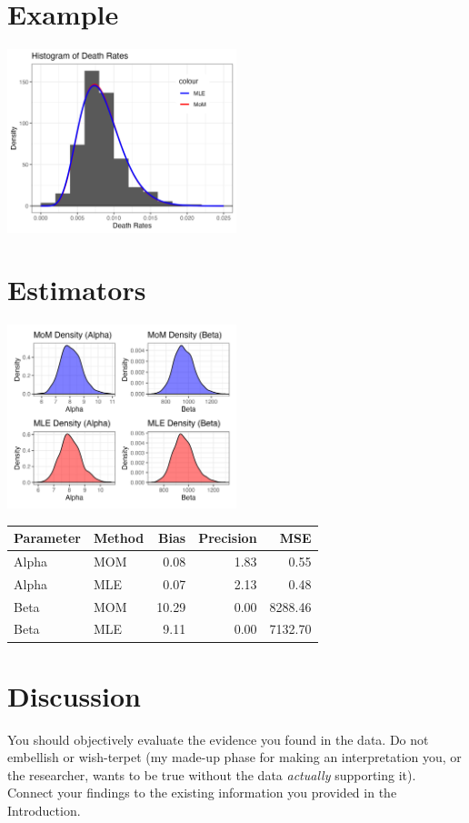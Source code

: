 \documentclass{article}\usepackage[]{graphicx}\usepackage[]{xcolor}
\newenvironment{Figure}
  {\par\medskip\noindent\minipage{\linewidth}}
  {\endminipage\par\medskip}
\begin{document}
\begin{multicols}{2}
\section{Example}
\begin{center}
  \includegraphics[width=0.5\textwidth]{task7.png}
\end{center}

\section{Estimators}

\begin{center}
  \includegraphics[width=0.5\textwidth]{task8.png}
\end{center} 

\begin{Figure}
\centering
\begin{tabular}{llrrr}
  \hline
 Parameter & Method & Bias & Precision & MSE \\ 
  \hline
  Alpha & MOM & 0.08 & 1.83 & 0.55 \\ 
  Alpha & MLE & 0.07 & 2.13 & 0.48 \\ 
  Beta & MOM & 10.29 & 0.00 & 8288.46 \\ 
  Beta & MLE & 9.11 & 0.00 & 7132.70 \\ 
   \hline
\end{tabular}
\end{Figure}

\section{Discussion}
 You should objectively evaluate the evidence you found in the data. Do not embellish or wish-terpet (my made-up phase for making an interpretation you, or the researcher, wants to be true without the data \emph{actually} supporting it). Connect your findings to the existing information you provided in the Introduction.


\end{multicols}
\end{document}
